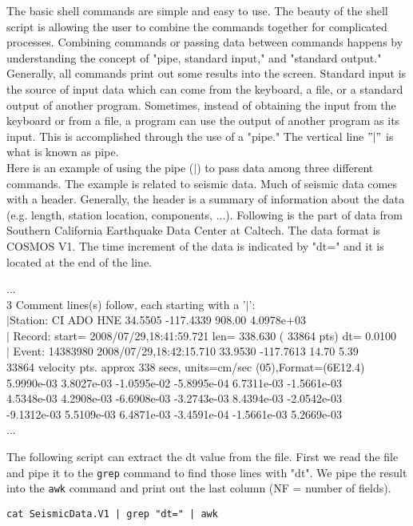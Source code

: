 \noindent
The basic shell commands are simple and easy to use. The beauty of the shell script is allowing the user to combine the commands together for complicated 
processes. Combining commands or passing data between commands happens by understanding the concept of "pipe, standard input," and "standard output." Generally, all commands print out some results into the screen. Standard input is the source of input data which can come from the keyboard, a file, or a standard output of another program. Sometimes, instead of obtaining the input from the keyboard or from a file, a program can use the output of another program as its input. This is accomplished through the use of a "pipe." The vertical line $"\vert"$  is what is known as pipe. \\
\noindent
Here is an example of using the pipe ($\vert$) to pass data among three different commands. The example is related to seismic data. Much of seismic data comes with a header. Generally, the header is a summary of information about the data (e.g. length, station location, components, ...). Following is the part of data from Southern California Earthquake Data Center at Caltech. The data format is COSMOS V1. The time increment of the data is indicated by "dt=" and it is located at the end of the line. \\



\begin{mdframed}[hidealllines=true,backgroundcolor=gray!20]
\begin{singlespace}
\fontsize{8pt}{1pt}
\textrm{
...\\
   3 Comment lines(s) follow, each starting with a '$\vert$':     \\                    
$\vert$Station: CI ADO HNE   34.5505   -117.4339 908.00   4.0978e+03 \\                 
$\vert$ Record: start= 2008/07/29,18:41:59.721 len=  338.630 ( 33864 pts) dt= 0.0100  \\
$\vert$ Event:  14383980 2008/07/29,18:42:15.710   33.9530   -117.7613  14.70  5.39   \\
   33864 velocity pts.     approx  338 secs, units=cm/sec (05),Format=(6E12.4)  \\
  5.9990e-03  3.8027e-03 -1.0595e-02 -5.8995e-04  6.7311e-03 -1.5661e-03    \\    
  4.5348e-03  4.2908e-03 -6.6908e-03 -3.2743e-03  8.4394e-03 -2.0542e-03     \\   
 -9.1312e-03  5.5109e-03  6.4871e-03 -3.4591e-04 -1.5661e-03  5.2669e-03   \\     
 ...
}
\end{singlespace}
\end{mdframed}
\noindent
The following script can extract the dt value from the file. First we read the file and pipe it to the \texttt{grep} command to find those lines with "dt". We pipe the result into the \texttt{awk} command and print out the last column (NF = number of fields). 

\begin{mdframed}[hidealllines=true,backgroundcolor=gray!20]
\fontsize{10pt}{1pt}
\texttt{cat SeismicData.V1 | grep "dt=" | awk }
\end{mdframed}



